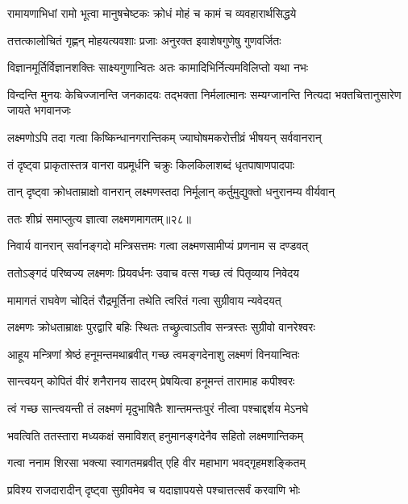 \twolineshloka
{रामायणाभिधां रामो भूत्वा मानुषचेष्टकः}
{क्रोधं मोहं च कामं च व्यवहारार्थसिद्धये} %

\twolineshloka
{तत्तत्कालोचितं गृह्णन् मोहयत्यवशाः प्रजाः}
{अनुरक्त इवाशेषगुणेषु गुणवर्जितः} %

\twolineshloka
{विज्ञानमूर्तिर्विज्ञानशक्तिः साक्ष्यगुणान्वितः}
{अतः कामादिभिर्नित्यमविलिप्तो यथा नभः} %

\threelineshloka
{विन्दन्ति मुनयः केचिज्जानन्ति जनकादयः}
{तद्भक्ता निर्मलात्मानः सम्यग्जानन्ति नित्यदा}
{भक्तचित्तानुसारेण जायते भगवानजः} %

\twolineshloka
{लक्ष्मणोऽपि तदा गत्वा किष्किन्धानगरान्तिकम्}
{ज्याघोषमकरोत्तीव्रं भीषयन् सर्ववानरान्} %

\twolineshloka
{तं दृष्ट्वा प्राकृतास्तत्र वानरा वप्रमूर्धनि}
{चक्रुः किलकिलाशब्दं धृतपाषाणपादपाः} %

\twolineshloka
{तान् दृष्ट्वा क्रोधताम्राक्षो वानरान् लक्ष्मणस्तदा}
{निर्मूलान् कर्तुमुद्युक्तो धनुरानम्य वीर्यवान्} %

{ततः शीघ्रं समाप्लुत्य ज्ञात्वा लक्ष्मणमागतम्॥२८॥} %


\twolineshloka
{निवार्य वानरान् सर्वानङ्गदो मन्त्रिसत्तमः}
{गत्वा लक्ष्मणसामीप्यं प्रणनाम स दण्डवत्} %

\twolineshloka
{ततोऽङ्गदं परिष्वज्य लक्ष्मणः प्रियवर्धनः}
{उवाच वत्स गच्छ त्वं पितृव्याय निवेदय} %

\twolineshloka
{मामागतं राघवेण चोदितं रौद्रमूर्तिना}
{तथेति त्वरितं गत्वा सुग्रीवाय न्यवेदयत्} %

\twolineshloka
{लक्ष्मणः क्रोधताम्राक्षः पुरद्वारि बहिः स्थितः}
{तच्छ्रुत्वाऽतीव सन्त्रस्तः सुग्रीवो वानरेश्वरः} %

\twolineshloka
{आहूय मन्त्रिणां श्रेष्ठं हनूमन्तमथाब्रवीत्}
{गच्छ त्वमङ्गदेनाशु लक्ष्मणं विनयान्वितः} %

\twolineshloka
{सान्त्वयन् कोपितं वीरं शनैरानय सादरम्}
{प्रेषयित्वा हनूमन्तं तारामाह कपीश्वरः} %

\twolineshloka
{त्वं गच्छ सान्त्वयन्ती तं लक्ष्मणं मृदुभाषितैः}
{शान्तमन्तःपुरं नीत्वा पश्चाद्दर्शय मेऽनघे} %

\twolineshloka
{भवत्विति ततस्तारा मध्यकक्षं समाविशत्}
{हनुमानङ्गदेनैव सहितो लक्ष्मणान्तिकम्} %

\twolineshloka
{गत्वा ननाम शिरसा भक्त्या स्वागतमब्रवीत्}
{एहि वीर महाभाग भवद्गृहमशङ्कितम्} %

\twolineshloka
{प्रविश्य राजदारादीन् दृष्ट्वा सुग्रीवमेव च}
{यदाज्ञापयसे पश्चात्तत्सर्वं करवाणि भोः} %

